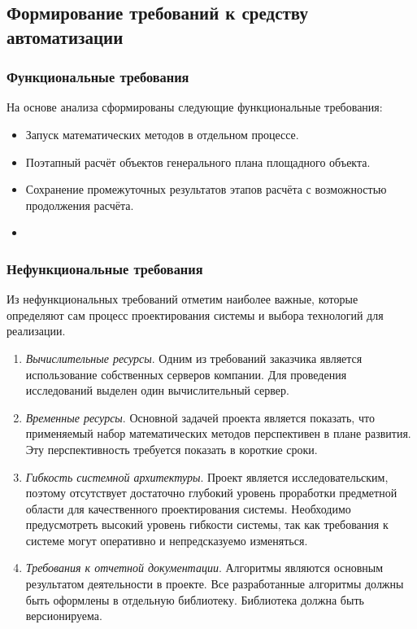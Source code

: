 \subsection*{\large{Формирование требований к средству автоматизации}}

\subsubsection*{\large{Функциональные требования}}

На основе анализа сформированы следующие функциональные требования:
\begin{itemize}
    \item {
        Запуск математических методов в отдельном процессе.
    }
    \item {
        Поэтапный расчёт объектов генерального плана площадного объекта.
    }
    \item {
        Сохранение промежуточных результатов этапов расчёта с возможностью продолжения расчёта.
    }
    \item {

    }
\end{itemize}

\subsubsection*{\large{Нефункциональные требования}}

Из нефункциональных требований отметим наиболее важные, которые определяют сам процесс проектирования системы
и выбора технологий для реализации.

\begin{enumerate}
    \item {
        \textit{Вычислительные ресурсы}.
        Одним из требований заказчика является использование собственных серверов компании.
        Для проведения исследований выделен один вычислительный сервер.
    }
    \item {
        \textit{Временные ресурсы}.
        Основной задачей проекта является показать, что применяемый набор математических
        методов перспективен в плане развития. Эту перспективность требуется показать в короткие сроки.
    }
    \item {
        \textit{Гибкость системной архитектуры}.
        Проект является исследовательским, поэтому
        отсутствует достаточно глубокий уровень проработки предметной области для качественного проектирования системы.
        Необходимо предусмотреть высокий уровень гибкости системы,
        так как требования к системе могут оперативно и непредсказуемо изменяться.
    }
    \item {
        \textit{Требования к отчетной документации}.
        Алгоритмы являются основным результатом деятельности в проекте.
        Все разработанные алгоритмы должны быть оформлены в отдельную библиотеку.
        Библиотека должна быть версионируема.
    }
\end{enumerate}